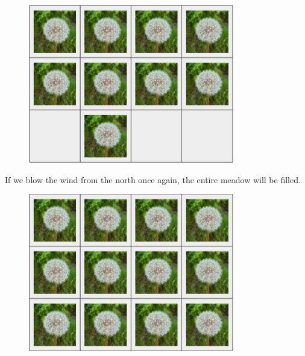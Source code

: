 \begin{centering}
  \begin{figure}[h]
      \centering
      \includegraphics[width=0.8\textwidth]{t2.png}
  \end{figure}
\end{centering}
If we blow the wind from the north once again, the entire meadow will be filled.
\begin{centering}
  \begin{figure}[h]
      \centering
      \includegraphics[width=0.8\textwidth]{t3.png}
  \end{figure}
\end{centering}
